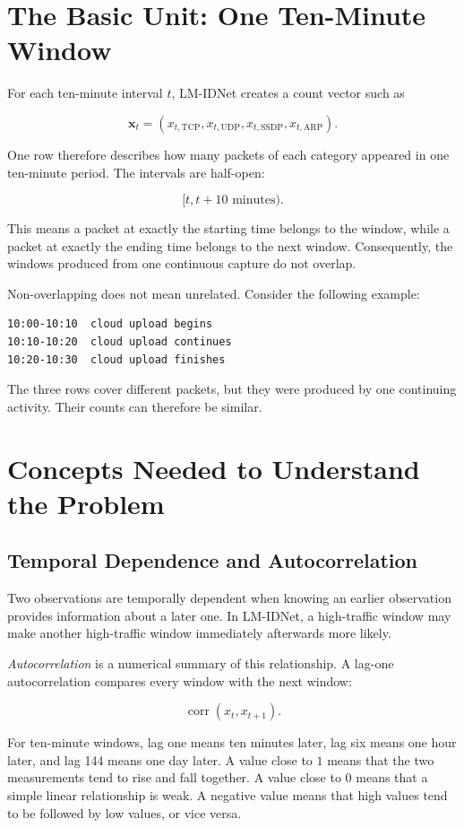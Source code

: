 \documentclass[11pt,a4paper]{article}
\begin{document}
\section{The Basic Unit: One Ten-Minute Window}

For each ten-minute interval $t$, LM-IDNet creates a count vector such as

\[
\mathbf{x}_t =
\left(
x_{t,\mathrm{TCP}},
x_{t,\mathrm{UDP}},
x_{t,\mathrm{SSDP}},
x_{t,\mathrm{ARP}}
\right).
\]

One row therefore describes how many packets of each category appeared in one
ten-minute period. The intervals are half-open:

\[
[t,t+10\text{ minutes}).
\]

This means a packet at exactly the starting time belongs to the window, while a
packet at exactly the ending time belongs to the next window. Consequently,
the windows produced from one continuous capture do not overlap.

Non-overlapping does not mean unrelated. Consider the following example:

\begin{verbatim}
10:00-10:10  cloud upload begins
10:10-10:20  cloud upload continues
10:20-10:30  cloud upload finishes
\end{verbatim}

The three rows cover different packets, but they were produced by one continuing
activity. Their counts can therefore be similar.

\section{Concepts Needed to Understand the Problem}

\subsection{Temporal Dependence and Autocorrelation}

Two observations are temporally dependent when knowing an earlier observation
provides information about a later one. In LM-IDNet, a high-traffic window may
make another high-traffic window immediately afterwards more likely.

\emph{Autocorrelation} is a numerical summary of this relationship. A lag-one
autocorrelation compares every window with the next window:

\[
\operatorname{corr}(x_t,x_{t+1}).
\]

For ten-minute windows, lag one means ten minutes later, lag six means one hour
later, and lag 144 means one day later. A value close to $1$ means that the
two measurements tend to rise and fall together. A value close to $0$ means
that a simple linear relationship is weak. A negative value means that high
values tend to be followed by low values, or vice versa.
\end{document}
